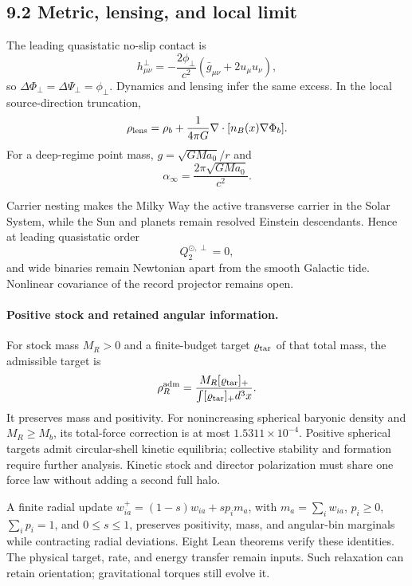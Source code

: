 \documentclass[11pt]{article}
\begin{document}
\subsection{9.2 Metric, lensing, and local limit}

The leading quasistatic no-slip contact is
\[
\boxed{
h_{\mu\nu}^\perp
=-\frac{2\phi_\perp}{c^2}
(\bar g_{\mu\nu}+2u_\mu u_\nu),
}
\]
so $\Delta\Phi_\perp=\Delta\Psi_\perp=\phi_\perp$. Dynamics and lensing infer the same excess. In the local source-direction truncation,
\[
\rho_{\rm lens}
=\rho_b+\frac1{4\pi G}\nabla\cdot[n_B(x)\nabla\Phi_b].
\]
For a deep-regime point mass, $g=\sqrt{GMa_0}/r$ and
\[
\alpha_\infty=\frac{2\pi\sqrt{GMa_0}}{c^2}.
\]

Carrier nesting makes the Milky Way the active transverse carrier in the Solar System, while the Sun and planets remain resolved Einstein descendants. Hence at leading quasistatic order
\[
\boxed{Q_2^{\odot,\perp}=0},
\]
and wide binaries remain Newtonian apart from the smooth Galactic tide. Nonlinear covariance of the record projector remains open.

\paragraph{Positive stock and retained angular information.}
For stock mass $M_R>0$ and a finite-budget target $\varrho_{\rm tar}$ of that total mass, the admissible target is
\[
\rho_R^{\rm adm}=\frac{M_R[\varrho_{\rm tar}]_+}{\int[\varrho_{\rm tar}]_+d^3x}.
\]
It preserves mass and positivity. For nonincreasing spherical baryonic density and $M_R\ge M_b$, its total-force correction is at most $1.5311\times10^{-4}$. Positive spherical targets admit circular-shell kinetic equilibria; collective stability and formation require further analysis. Kinetic stock and director polarization must share one force law without adding a second full halo.

A finite radial update $w_{ia}^+=(1-s)w_{ia}+sp_i m_a$, with $m_a=\sum_iw_{ia}$, $p_i\ge0$, $\sum_ip_i=1$, and $0\le s\le1$, preserves positivity, mass, and angular-bin marginals while contracting radial deviations. Eight Lean theorems verify these identities. The physical target, rate, and energy transfer remain inputs. Such relaxation can retain orientation; gravitational torques still evolve it.
\end{document}
